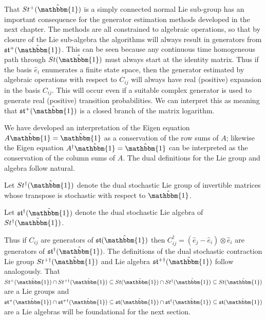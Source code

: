 That $St^{+}(\hat{\mathbbm{1}})$ is a simply connected normal Lie sub-group has an important
consequence for the generator estimation methods developed in the next chapter. The methods
are all constrained to algebraic operations, so that by closure of the Lie sub-algebra the
algorithms will always result in generators from $\mathfrak{st}^{+}(\hat{\mathbbm{1}})$.
This can be seen because any continuous time homogeneous path through $St(\hat{\mathbbm{1}})$
must always start at the identity matrix. Thus if the basis $\hat{e}_i$  enumerates a finite
state space, then the generator estimated by algebraic operations with respect to $C_{ij}$
will always have real (positive) expansion in the basis $C_{ij}$. This will occur even if a
suitable complex generator is used to generate real (positive) transition probabilities. We
can interpret this as meaning that $\mathfrak{st}^{+}(\hat{\mathbbm{1}})$ is a closed branch
of the matrix logarithm.

We have developed an interpretation of the Eigen equation $A \hat{\mathbbm{1}} = \hat{\mathbbm{1}}$
as a conservation of the row sums of $A$; likewise the Eigen equation $A^\dagger \hat{\mathbbm{1}} = \hat{\mathbbm{1}}$
can be interpreted as the conservation of the column sums of $A$. The dual definitions for
the Lie group and algebra follow natural.
\begin{definition}
	Let $St^\dagger(\hat{\mathbbm{1}})$ denote the dual stochastic Lie group of 
	invertible matrices whose transpose is stochastic with respect to $\hat{\mathbbm{1}}$.
\end{definition}

\begin{definition}
	Let $\mathfrak{st}^\dagger(\hat{\mathbbm{1}})$ denote the dual stochastic Lie 
	algebra of $St^\dagger(\hat{\mathbbm{1}})$.
\end{definition}
Thus if $C_{ij}$ are generators of $\mathfrak{st}(\hat{\mathbbm{1}})$ then $C_{ij}^\dagger = \left(\hat{e}_j - \hat{e}_i \right) \otimes \hat{e}_i$
are generators of $\mathfrak{st}^\dagger(\hat{\mathbbm{1}})$. The definitions of the dual 
stochastic contraction Lie group $St^{+\dagger}(\hat{\mathbbm{1}})$ and Lie algebra $\mathfrak{st}^{+\dagger}(\hat{\mathbbm{1}})$
follow analogously. That $St^{+}(\hat{\mathbbm{1}}) \cap St^{+\dagger}(\hat{\mathbbm{1}}) \subseteq St(\hat{\mathbbm{1}}) \cap St^\dagger(\hat{\mathbbm{1}}) \subseteq St(\hat{\mathbbm{1}})$ 
are a Lie groups and $\mathfrak{st}^{+}(\hat{\mathbbm{1}}) \cap \mathfrak{st}^{+\dagger}(\hat{\mathbbm{1}}) \subseteq \mathfrak{st}(\hat{\mathbbm{1}}) \cap \mathfrak{st}^\dagger(\hat{\mathbbm{1}}) \subseteq \mathfrak{st}(\hat{\mathbbm{1}})$ 
are a Lie algebras will be foundational for the next section.
